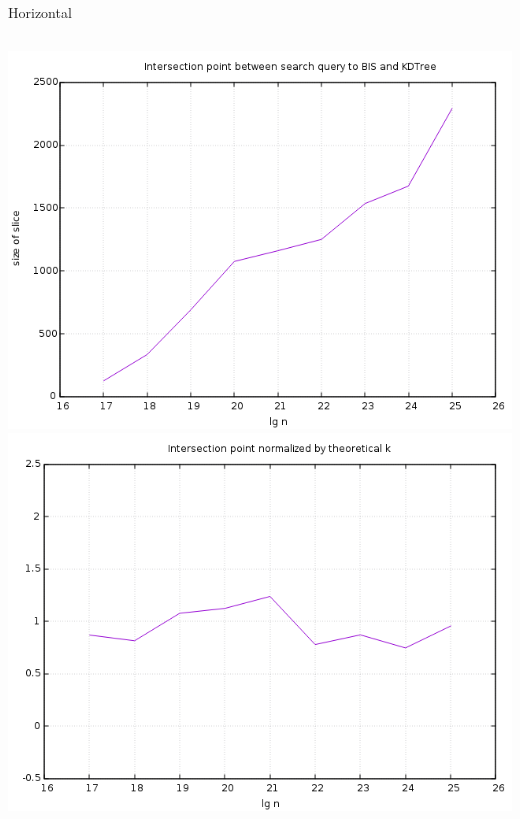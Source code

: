 \documentclass[pdf]{beamer}
\begin{document}
\begin{frame}{Horizontal}
  \begin{columns}
    \includegraphics[scale=0.3]{pictures/analysis/hori.png}
    \includegraphics[scale=0.3]{pictures/analysis/hori_theory.png}
  \end{columns}
\end{frame}
\end{document}
